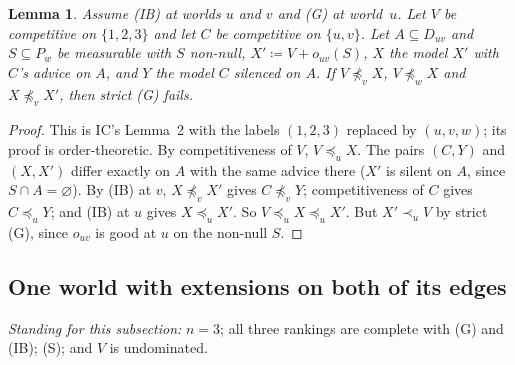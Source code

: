 \documentclass[11pt]{article}
\newtheorem{lemma}[theorem]{Lemma}
\theoremstyle{definition}\newtheorem{definition}[theorem]{Definition}
\theoremstyle{remark}\newtheorem{remark}[theorem]{Remark}
\begin{document}
\begin{lemma}\label{lem:chain}
Assume (IB) at worlds $u$ and $v$ and (G) at world~$u$. Let $V$ be
competitive on $\{1,2,3\}$ and let $C$ be competitive on $\{u,v\}$. Let
$A\subseteq D_{uv}$ and $S\subseteq P_w$ be measurable with $S$ non-null,
$X'\coloneqq V+o_{uv}(S)$, $X$ the model $X'$ with $C$'s advice on $A$, and $Y$
the model $C$ silenced on $A$. If $V\not\preceq_vX$, $V\not\preceq_wX$ and
$X\not\preceq_vX'$, then strict (G) fails.
\end{lemma}
\begin{proof}
This is IC's Lemma~2 with the labels $(1,2,3)$ replaced by $(u,v,w)$; its
proof is order-theoretic. By competitiveness of $V$, $V\preceq_uX$. The
pairs $(C,Y)$ and $(X,X')$ differ exactly on $A$ with the same advice there
($X'$ is silent on $A$, since $S\cap A=\varnothing$). By (IB) at $v$,
$X\not\preceq_vX'$ gives $C\not\preceq_vY$; competitiveness of $C$ gives
$C\preceq_uY$; and (IB) at $u$ gives $X\preceq_uX'$. So
$V\preceq_uX\preceq_uX'$. But $X'\prec_uV$ by strict (G), since $o_{uv}$ is
good at $u$ on the non-null $S$.
\end{proof}

\subsection{One world with extensions on both of its edges}

\emph{Standing for this subsection:} $n=3$; all three rankings are complete
with (G) and (IB); (S); and $V$ is undominated.
\end{document}
